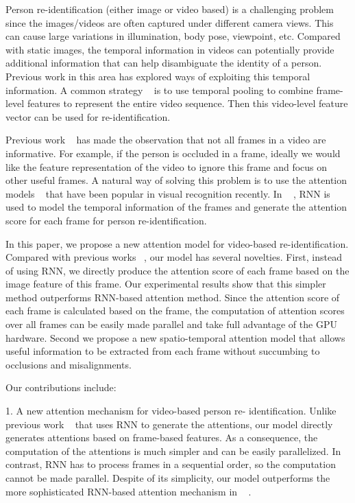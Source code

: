 \documentclass[sigconf, authordraft,review=false]{acmart}
\begin{document}
Person re-identification (either image or video based) is a challenging problem since the images/videos are often captured under different camera views. This can cause large variations in illumination, body pose, viewpoint, etc. Compared with static images, the temporal information in videos can potentially provide additional information that can help
disambiguate the identity of a person. Previous work in this area has explored ways of exploiting this temporal information. A common strategy ~\cite{mclaughlin16_cvpr,xu17_iccv,zhou17_cvpr} is to use temporal pooling to combine frame-level features to represent the entire video sequence.  Then this video-level feature vector
can be used for re-identification.

Previous work ~\cite{xu17_iccv,zhou17_cvpr} has made the observation that not all frames in a video are informative. For example, if the person is occluded in a frame, ideally we would like the feature representation of the video to ignore this frame and focus on other useful frames. A natural way of solving this problem is to use the attention models  ~\cite{bahdanau15_iclr,shih16_cvpr,xu15_icml} that  have  been  popular  in  visual  recognition  recently. In ~\cite{xu17_iccv,zhou17_cvpr}
, RNN is used to model the temporal information of the frames and generate the attention score for each frame for person re-identification.

In  this  paper,  we  propose  a  new  attention  model  for video-based  re-identification.
Compared  with  previous works ~\cite{xu17_iccv,zhou17_cvpr}, our model has several novelties.  First, instead of using RNN, we directly produce the attention score of each frame based on the image feature of this frame. Our experimental results show that this simpler method outperforms  RNN-based  attention  method.   Since  the  attention score of each frame is calculated based on the frame,  the computation of attention scores over all frames can be easily made parallel and take full advantage of the GPU hardware. Second we propose a new spatio-temporal attention model that allows useful information to be extracted from each frame without succumbing to occlusions and misalignments.

Our contributions include:

1.  A new attention mechanism for video-based person  re-
identification. Unlike  previous  work ~\cite{zhou17_cvpr}  that uses  RNN  to  generate  the  attentions,  our  model  directly generates attentions based on frame-based features. As a consequence, the computation of the attentions is much simpler and can be easily parallelized.
In contrast, RNN has to process frames in a sequential order, so the computation cannot be made parallel. Despite of its simplicity, our model outperforms the more sophisticated RNN-based attention mechanism in ~\cite{zhou17_cvpr} .\\
\end{document}
